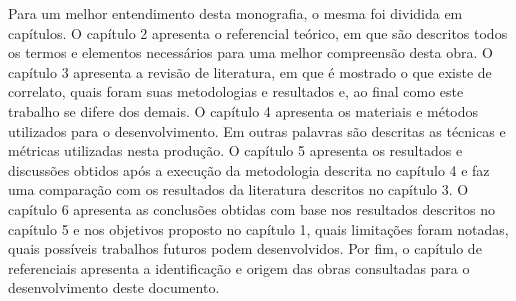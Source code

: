 Para um melhor entendimento desta monografia, o mesma foi dividida em capítulos. O capítulo 2 apresenta o referencial teórico, em que são descritos todos os termos e elementos necessários para uma melhor compreensão desta obra. O capítulo 3 apresenta a revisão de literatura, em que é mostrado o que existe de correlato, quais foram suas metodologias e resultados e, ao final como este trabalho se difere dos demais. O capítulo 4 apresenta os materiais e métodos utilizados para o desenvolvimento. Em outras palavras são descritas as técnicas e métricas utilizadas nesta produção. O capítulo 5 apresenta os resultados e discussões obtidos após a execução da metodologia descrita no capítulo 4 e faz uma comparação com os resultados da literatura descritos no capítulo 3. O capítulo 6 apresenta as conclusões obtidas com base nos resultados descritos no capítulo 5 e nos objetivos proposto no capítulo 1, quais limitações foram notadas, quais possíveis trabalhos futuros podem desenvolvidos. Por fim, o capítulo de referenciais apresenta a identificação e origem das obras consultadas para o desenvolvimento deste documento. 